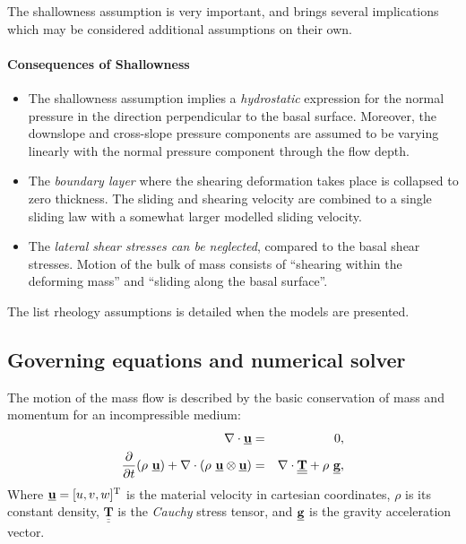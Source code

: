 \documentclass{article}
\def\dt{\partial t}
\begin{document}
The shallowness assumption is very important, and brings several implications which may be considered additional assumptions on their own.

\paragraph{Consequences of Shallowness}
\begin{itemize}
\item The shallowness assumption implies a \textit{hydrostatic} expression for the normal pressure in the direction perpendicular to the basal surface. Moreover, the downslope and cross-slope pressure components are assumed to be varying linearly with the normal pressure component through the flow depth.

\item The \textit{boundary layer} where the shearing deformation takes place is collapsed to zero thickness. The sliding and shearing velocity are combined to a single sliding law with a somewhat larger modelled sliding velocity.

\item The \textit{lateral shear stresses can be neglected}, compared to the basal shear stresses. Motion of the bulk of mass consists of ``shearing within the deforming mass'' and ``sliding along the basal surface''.
\end{itemize}

The list rheology assumptions is detailed when the models are presented.



\subsection{Governing equations and numerical solver}\label{subsec:GovEqsBCs}
The motion of the mass flow is described by the basic conservation of mass and momentum for an incompressible medium:
\begin{eqnarray}\label{eq:N_S}
\nabla \cdot\underline{{\textbf u}} &=& 0, \nonumber \\
\dfrac{\partial}{\dt}(\rho \ \underline{{\textbf u}})+\nabla \cdot (\rho \ \underline{{\textbf u}}\otimes \underline{{\textbf u}}) &=& \nabla \cdot \underline{\underline{{\mathbf{T}}}}+\rho \ \underline{{\textbf g}},
\end{eqnarray}
Where $\underline{{\textbf u}}=[u, v, w]^{\mathrm{T}}$ is the material velocity in cartesian coordinates, $\rho$ is its constant density, $\underline{\underline{{\mathbf{T}}}}$ is the \textit{Cauchy} stress tensor, and $\underline{{\textbf g}}$ is the gravity acceleration vector.
\end{document}
